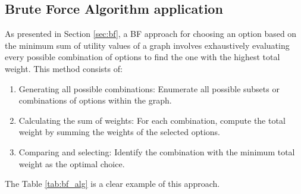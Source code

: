 \subsection{Brute Force Algorithm application}
As presented in Section \ref{sec:bf}, a BF approach for choosing an option based on the minimum sum of utility values of a graph involves exhaustively evaluating every possible combination of options to find the one with the highest total weight. 
This method consists of:
\begin{enumerate}
  \item Generating all possible combinations: Enumerate all possible subsets or combinations of options within the graph.
  \item Calculating the sum of weights: For each combination, compute the total weight by summing the weights of the selected options.
  \item Comparing and selecting: Identify the combination with the minimum total weight as the optimal choice.
\end{enumerate}
The Table \ref{tab:bf_alg} is a clear example of this approach. \\   

